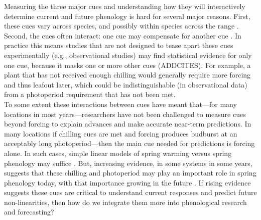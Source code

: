 \documentclass[11pt,letter]{article}
\begin{document}
Measuring the three major cues and understanding how they will interactively determine current and future phenology is hard for several major reasons. First, these cues vary across species, and possibly within species across the range  \citep{vitasse2009,harrington2015}. Second, the cues often interact: one cue may compensate for another cue \citep{Chuine2000}. In practice this means studies that are not designed to tease apart these cues experimentally (e.g., observational studies) may find statistical evidence for only one cue, because it masks one or more other cues (ADDCITES). For example, a plant that has not received enough chilling would generally require more forcing and thus leafout later, which could be indistinguishable (in observational data) from a photoperiod requirement that has not been met. \\

To some extent these interactions between cues have meant that---for many locations in most years---researchers have not been challenged to measure cues beyond forcing to explain advances and make accurate near-term predictions. In many locations if chilling cues are met and forcing produces budburst at an acceptably long photoperiod---then the main cue needed for predictions is forcing alone. In such cases, simple linear models of spring warming versus spring phenology may suffice \citep[e.g.,]{Ellwood2012}. But, increasing evidence, in some systems in some years, suggests that these chilling and photoperiod may play an important role in spring phenology today, with that importance growing in the future \citep{chuine2016,gauzere2019}. If rising evidence suggests these cues are critical to understand current responses and predict future non-linearities, then how do we integrate them more into phenological research and forecasting? \\%
\end{document}
